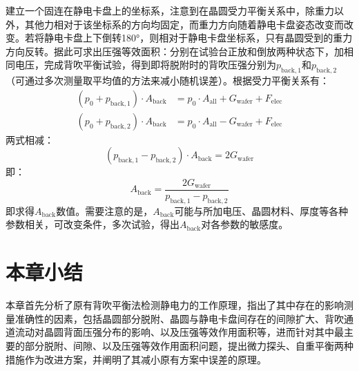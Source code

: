 建立一个固连在静电卡盘上的坐标系，注意到在晶圆受力平衡关系中，除重力以外，其他力相对于该坐标系的方向均固定，而重力方向随着静电卡盘姿态改变而改变。若将静电卡盘上下倒转\ang{180}，则相对于静电卡盘坐标系，只有晶圆受到的重力方向反转。据此可求出压强等效面积：分别在试验台正放和倒放两种状态下，加相同电压，完成背吹平衡试验，得到即将脱附时的背吹压强分别为$p_{\mathrm{back},1}$和$p_{\mathrm{back},2}$（可通过多次测量取平均值的方法来减小随机误差）。根据受力平衡关系有：
\begin{equation}
\label{eq:principle-area-gravity-orig}
\begin{aligned}
(p_{0} + p_{\mathrm{back},1}) \cdot A_{\mathrm{back}} & = p_0 \cdot A_{\mathrm{all}} + G_{\mathrm{wafer}} + F_{\mathrm{elec}} \\
(p_{0} + p_{\mathrm{back},2}) \cdot A_{\mathrm{back}} & = p_0 \cdot A_{\mathrm{all}} - G_{\mathrm{wafer}} + F_{\mathrm{elec}}
\end{aligned}
\end{equation}
两式相减：
\[
(p_{\mathrm{back},1} - p_{\mathrm{back},2}) \cdot A_{\mathrm{back}} = 2 G_{\mathrm{wafer}}
\]
即：
\begin{equation}
\label{eq:principle-area-gravity-derived}
A_{\mathrm{back}} = \frac{2 G_{\mathrm{wafer}}}{p_{\mathrm{back},1} - p_{\mathrm{back},2}}
\end{equation}
即求得$A_{\mathrm{back}}$数值。需要注意的是，$A_{\mathrm{back}}$可能与所加电压、晶圆材料、厚度等各种参数相关，可改变条件，多次试验，得出$A_{\mathrm{back}}$对各参数的敏感度。



\section{本章小结}\label{sec:principle-summary}

本章首先分析了原有背吹平衡法检测静电力的工作原理，指出了其中存在的影响测量准确性的因素，包括晶圆部分脱附、晶圆与静电卡盘间存在的间隙扩大、背吹通道流动对晶圆背面压强分布的影响、以及压强等效作用面积等，进而针对其中最主要的部分脱附、间隙、以及压强等效作用面积问题，提出微力探头、自重平衡两种措施作为改进方案，并阐明了其减小原有方案中误差的原理。
